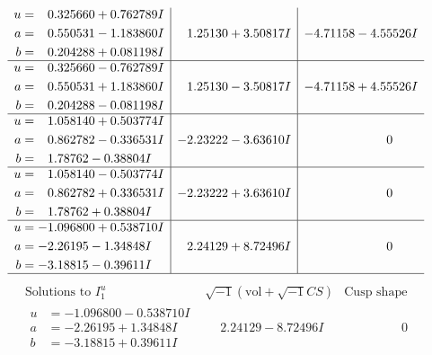 \documentclass[1p]{elsarticle_modified}
\theoremstyle{definition}
\newcommand{\I}{\sqrt{-1}}
\begin{document}
$$\begin{array}{c|c|c}
\begin{aligned}
u &= \phantom{-}0.325660 + 0.762789 I \\
a &= \phantom{-}0.550531 - 1.183860 I \\
b &= \phantom{-}0.204288 + 0.081198 I\end{aligned}
 & \phantom{-}1.25130 + 3.50817 I & -4.71158 - 4.55526 I \\ \hline\begin{aligned}
u &= \phantom{-}0.325660 - 0.762789 I \\
a &= \phantom{-}0.550531 + 1.183860 I \\
b &= \phantom{-}0.204288 - 0.081198 I\end{aligned}
 & \phantom{-}1.25130 - 3.50817 I & -4.71158 + 4.55526 I \\ \hline\begin{aligned}
u &= \phantom{-}1.058140 + 0.503774 I \\
a &= \phantom{-}0.862782 - 0.336531 I \\
b &= \phantom{-}1.78762 - 0.38804 I\end{aligned}
 & -2.23222 - 3.63610 I & \phantom{-0.000000 } 0 \\ \hline\begin{aligned}
u &= \phantom{-}1.058140 - 0.503774 I \\
a &= \phantom{-}0.862782 + 0.336531 I \\
b &= \phantom{-}1.78762 + 0.38804 I\end{aligned}
 & -2.23222 + 3.63610 I & \phantom{-0.000000 } 0 \\ \hline\begin{aligned}
u &= -1.096800 + 0.538710 I \\
a &= -2.26195 - 1.34848 I \\
b &= -3.18815 - 0.39611 I\end{aligned}
 & \phantom{-}2.24129 + 8.72496 I & \phantom{-0.000000 } 0\\
 \hline 
 \end{array}$$\newpage$$\begin{array}{c|c|c}  
\text{Solutions to }I^u_{1}& \I (\text{vol} + \sqrt{-1}CS) & \text{Cusp shape}\\
 \hline 
\begin{aligned}
u &= -1.096800 - 0.538710 I \\
a &= -2.26195 + 1.34848 I \\
b &= -3.18815 + 0.39611 I\end{aligned}
 & \phantom{-}2.24129 - 8.72496 I & \phantom{-0.000000 } 0 \\ \hline\begin{aligned}

\end{aligned}
\end{array}$$
\end{document}
